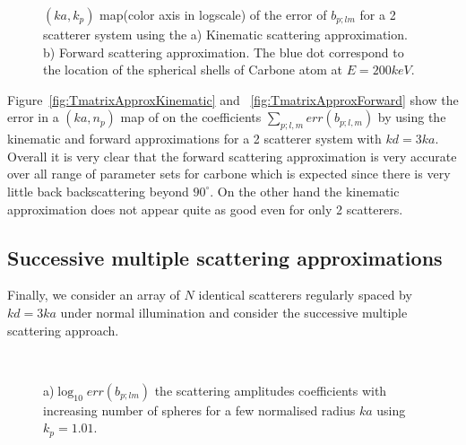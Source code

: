 \begin{figure}[h!]
  \centering
\caption{$(ka,k_p)$ map(color axis in logscale) of the error of $b_{p;lm}$
for a 2 scatterer system using the
a) Kinematic scattering approximation.
b) Forward scattering approximation.
The blue dot correspond to the location of the spherical shells of Carbone
atom at $E=200keV$.}%
\end{figure}
Figure~\ref{fig:TmatrixApproxKinematic} and ~\ref{fig:TmatrixApproxForward} show
the error in a $(ka,n_p)$ map of on the coefficients $\sum_{p;l,m}err(b_{p;l,m})$ by using
the kinematic and forward approximations for a 2 scatterer system with $kd=3ka$.
Overall it is very clear that the forward scattering approximation is very accurate
over all range of parameter sets for carbone which is expected since there is very
little back backscattering beyond $90^{\circ}$. On the other hand the kinematic
approximation does not appear quite as good even for only 2 scatterers.






\subsection{Successive multiple scattering approximations}

Finally, we consider an array of $N$ identical scatterers regularly spaced by
$kd=3ka$ under normal illumination and consider the successive multiple scattering
approach.

\begin{figure}[h!]
  \centering
  \\
  \vspace{-2em}
\caption{
a)$\log_{10}err(b_{p;lm})$ the scattering amplitudes coefficients with
increasing number of spheres for a few normalised radius $ka$ using $k_p=1.01$.
}%
\end{figure}

